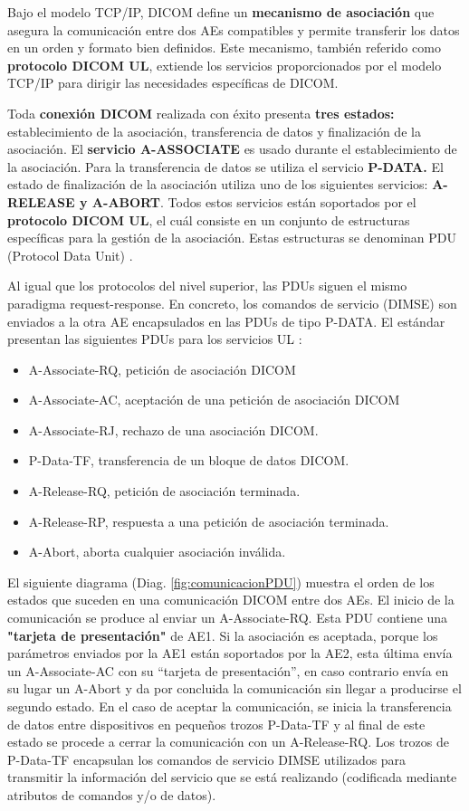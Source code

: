 Bajo el modelo TCP/IP, \acs{DICOM} define un \textbf{mecanismo de asociación} que asegura la comunicación entre dos AEs compatibles y permite transferir los datos en un orden y formato bien definidos. Este mecanismo, también referido como \textbf{protocolo \acs{DICOM UL}}, extiende los servicios proporcionados por el modelo TCP/IP para dirigir las necesidades específicas de \acs{DICOM}.

Toda \textbf{conexión \acs{DICOM}} realizada con éxito presenta \textbf{tres estados:} establecimiento de la asociación, transferencia de datos y finalización de la asociación. El \textbf{servicio A-ASSOCIATE} es usado durante el establecimiento de la asociación. Para la transferencia de datos se utiliza el servicio \textbf{P-DATA.} El estado de finalización de la asociación utiliza uno de los siguientes servicios: \textbf{A-RELEASE y A-ABORT}. Todos estos servicios están soportados por el \textbf{protocolo \acs{DICOM UL}}, el cuál consiste en un conjunto de estructuras específicas para la gestión de la asociación. Estas estructuras se denominan PDU (Protocol Data Unit) \cite{17}.

Al igual que los protocolos del nivel superior, las PDUs siguen el mismo paradigma request-response. En concreto, los comandos de servicio (\acs{DIMSE}) son enviados a la otra AE encapsulados en las PDUs de tipo P-DATA. El estándar presentan las siguientes PDUs para los servicios UL \cite{10}:
\begin{itemize}
\item A-Associate-RQ, petición de asociación \acs{DICOM}
\item A-Associate-AC, aceptación de una petición de asociación \acs{DICOM}
\item A-Associate-RJ, rechazo de una asociación \acs{DICOM}.
\item P-Data-TF, transferencia de un bloque de datos DICOM.
\item A-Release-RQ, petición de asociación terminada.
\item A-Release-RP, respuesta a una petición de asociación terminada.
\item A-Abort, aborta cualquier asociación inválida.
\end{itemize}

El siguiente diagrama (Diag. \ref{fig:comunicacionPDU}) muestra el orden de los estados que suceden en una comunicación \acs{DICOM} entre dos AEs. El inicio de la comunicación se produce al enviar un A-Associate-RQ. Esta PDU contiene una \textbf{"tarjeta de presentación"} de AE1. Si la asociación es aceptada, porque los parámetros enviados por la AE1 están soportados por la AE2, esta última envía un A-Associate-AC con su “tarjeta de presentación”, en caso contrario envía en su lugar un A-Abort y da por concluida la comunicación sin llegar a producirse el segundo estado. En el caso de aceptar la comunicación, se inicia la transferencia de datos entre dispositivos en pequeños trozos P-Data-TF y al final de este estado se procede a cerrar la comunicación con un A-Release-RQ. Los trozos de P-Data-TF encapsulan los comandos de servicio \acs{DIMSE} utilizados para transmitir la información del servicio que se está realizando (codificada mediante atributos de comandos y/o de datos).

